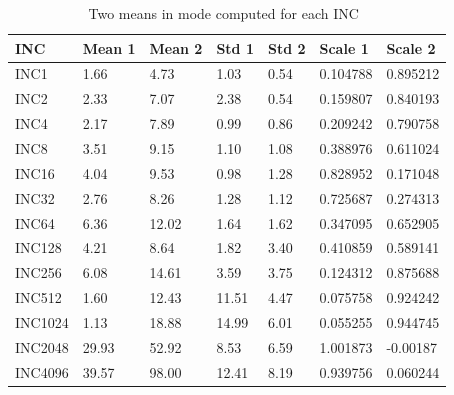 \begin{table}[h]
\begin{center}
\begin{tabular}{|l|l|l|l|l|l|l|} \hline
INC        & Mean 1 & Mean 2 & Std 1 & Std 2 & Scale 1 & Scale 2\\ \hline
INC1      & 1.66  & 4.73 & 1.03 & 0.54 & 0.104788 & 0.895212\\ \hline
INC2      & 2.33  & 7.07 & 2.38 & 0.54 & 0.159807 & 0.840193\\ \hline
INC4      & 2.17  & 7.89 & 0.99 & 0.86 & 0.209242 & 0.790758\\ \hline
INC8      & 3.51  & 9.15 & 1.10 & 1.08 & 0.388976 & 0.611024\\ \hline
INC16    & 4.04  & 9.53 & 0.98 & 1.28 & 0.828952 & 0.171048\\ \hline
INC32    & 2.76  & 8.26 & 1.28 & 1.12 & 0.725687 & 0.274313\\ \hline
INC64    & 6.36  & 12.02 & 1.64 & 1.62 &  0.347095 & 0.652905\\ \hline
INC128  & 4.21  & 8.64 & 1.82 & 3.40 & 0.410859 & 0.589141\\ \hline
INC256  & 6.08  & 14.61  & 3.59 & 3.75 & 0.124312 & 0.875688\\ \hline
INC512  & 1.60  & 12.43   & 11.51 & 4.47 & 0.075758 & 0.924242\\ \hline
INC1024 & 1.13  & 18.88  & 14.99 & 6.01 & 0.055255 & 0.944745\\ \hline
INC2048 & 29.93 & 52.92 & 8.53 & 6.59 & 1.001873 & -0.00187\\ \hline
INC4096 & 39.57 & 98.00 & 12.41 & 8.19 & 0.939756 & 0.060244\\ \hline
\end{tabular}
\end{center}
\vspace{-.2in}
\caption{Two means in mode computed for each INC~\label{tab:binormal_fit}}
\end{table}

\pagebreak
\clearpage

